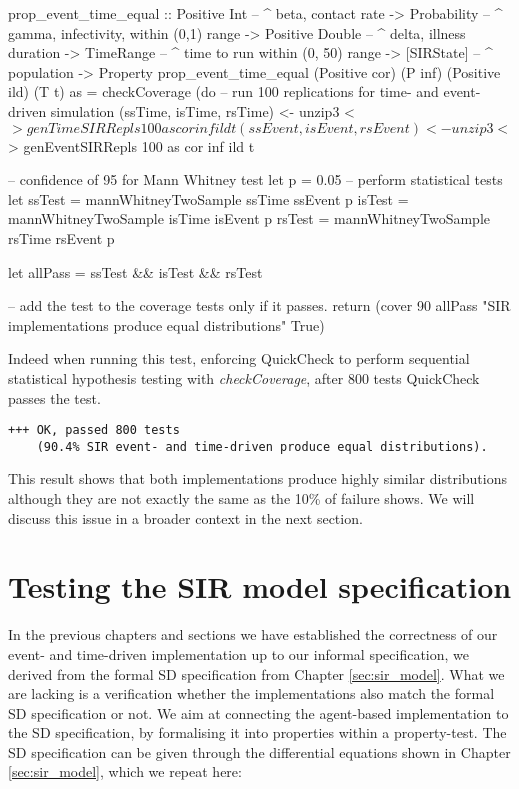 \begin{HaskellCode}
prop_event_time_equal :: Positive Int    -- ^ beta, contact rate
                      -> Probability     -- ^ gamma, infectivity, within (0,1) range
                      -> Positive Double -- ^ delta, illness duration
                      -> TimeRange       -- ^ time to run within (0, 50) range
                      -> [SIRState]      -- ^ population 
                      -> Property
prop_event_time_equal
    (Positive cor) (P inf) (Positive ild) (T t) as = checkCoverage (do
  -- run 100 replications for time- and event-driven simulation
  (ssTime, isTime, rsTime)    <- unzip3 <$> genTimeSIRRepls 100 as cor inf ild t
  (ssEvent, isEvent, rsEvent) <- unzip3 <$> genEventSIRRepls 100 as cor inf ild t
  
  -- confidence of 95 for Mann Whitney test
  let p = 0.05
  -- perform statistical tests
  let ssTest = mannWhitneyTwoSample ssTime ssEvent p
      isTest = mannWhitneyTwoSample isTime isEvent p
      rsTest = mannWhitneyTwoSample rsTime rsEvent p

  let allPass = ssTest && isTest && rsTest 

  -- add the test to the coverage tests only if it passes.
  return 
    (cover 90 allPass "SIR implementations produce equal distributions" True)
\end{HaskellCode}

Indeed when running this test, enforcing QuickCheck to perform sequential statistical hypothesis testing with \textit{checkCoverage}, after 800 tests QuickCheck passes the test.

\begin{verbatim}
+++ OK, passed 800 tests 
    (90.4% SIR event- and time-driven produce equal distributions).
\end{verbatim}

This result shows that both implementations produce highly similar distributions although they are not exactly the same as the 10\% of failure shows. We will discuss this issue in a broader context in the next section.

\section{Testing the SIR model specification}
\label{sec:prop_sirspecs}
In the previous chapters and sections we have established the correctness of our event- and time-driven implementation up to our informal specification, we derived from the formal SD specification from Chapter \ref{sec:sir_model}. What we are lacking is a verification whether the implementations also match the formal SD specification or not. We aim at connecting the agent-based implementation to the SD specification, by formalising it into properties within a property-test. The SD specification can be given through the differential equations shown in Chapter \ref{sec:sir_model}, which we repeat here:

